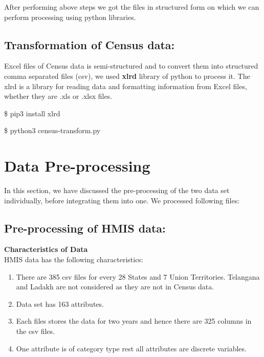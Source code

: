 \documentclass[12pt]{article}
\newenvironment{commandline}{
	\medskip
	\begin{mdframed}[style=commandline]
}{
	\end{mdframed}
	\medskip
}
\begin{document}
After performing above steps we got the files in structured form on which we can perform processing using python libraries.




\subsection{Transformation of Census data:}
Excel files of Census data is semi-structured and to convert them into structured comma separated files (csv), we used \textbf{xlrd} library of python to process it. The xlrd is a library for reading data and formatting information from Excel files, whether they are .xls or .xlsx files.\\


\begin{commandline}
\$ pip3 install xlrd

\medskip
\$ python3 census-transform.py
\end{commandline}

   



\section{Data Pre-processing}

In this section, we have discussed the pre-processing of the two data set individually, before integrating them into one. We processed following files:

\subsection{Pre-processing of HMIS data:}

\textbf{Characteristics of Data}\\
HMIS data has the following characteristics:
\begin{enumerate}
	\item There are 385 csv files for every 28 States and 7 Union Territories. Telangana and Ladakh are not considered as they are not in Census data.
	\item Data set has 163 attributes.
	\item Each files stores the data for two years and hence there are 325 columns in the csv files.
	\item One attribute is of category type rest all attributes are discrete variables.
\end{enumerate}
\end{document}
